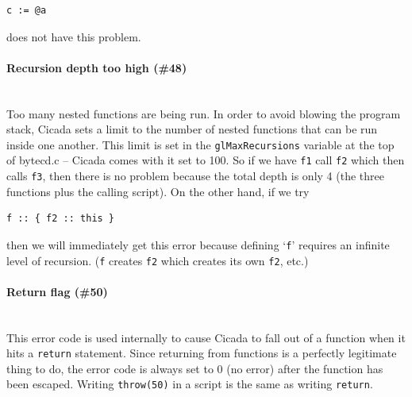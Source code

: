 \documentclass{article}
\newenvironment{code}{
       \begin{list}{}{
               \setlength{\leftmargin}{.4in}
               \setlength{\rightmargin}{0in}
               \setlength{\topsep}{.2in}
       }
       \small
       \item[] }
       { \end{list}   }
\begin{document}
\begin{code} \begin{verbatim}
c := @a
\end{verbatim} \end{code}

\noindent does not have this problem.\\




\paragraph{Recursion depth too high (\#48)\\\\}

Too many nested functions are being run.  In order to avoid blowing the program stack, Cicada sets a limit to the number of nested functions that can be run inside one another.  This limit is set in the \verb#glMaxRecursions# variable at the top of bytecd.c -- Cicada comes with it set to 100.  So if we have \verb#f1# call \verb#f2# which then calls \verb#f3#, then there is no problem because the total depth is only 4 (the three functions plus the calling script).  On the other hand, if we try\\

\begin{code} \begin{verbatim}
f :: { f2 :: this }
\end{verbatim} \end{code}

\noindent then we will immediately get this error because defining `\verb#f#' requires an infinite level of recursion.  (\verb#f# creates \verb#f2# which creates its own \verb#f2#, etc.)\\




\paragraph{Return flag (\#50)\\\\}

This error code is used internally to cause Cicada to fall out of a function when it hits a \verb#return# statement.  Since returning from functions is a perfectly legitimate thing to do, the error code is always set to 0 (no error) after the function has been escaped.  Writing \verb#throw(50)# in a script is the same as writing \verb#return#.
\end{document}
